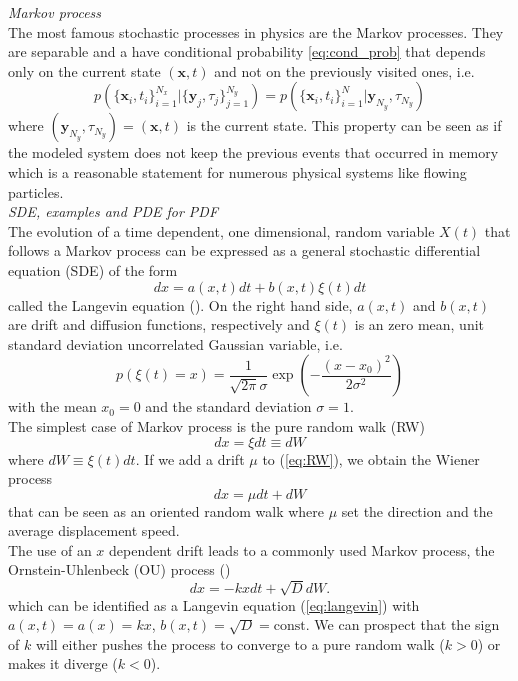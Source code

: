 \textit{Markov process}\\
The most famous stochastic processes in physics are the Markov processes. They are separable and a have conditional probability \eqref{eq:cond_prob} that depends only on the current state $(\textbf{x},t)$ and not on the previously visited ones, i.e. 
\[
p(\{\textbf{x}_i,t_i\}_{i=1}^{N_x}|\{\textbf{y}_j,\tau_j\}_{j=1}^{N_y})=p(\{\textbf{x}_i,t_i\}_{i=1}^N|\textbf{y}_{N_y},\tau_{N_y})
\]
where $(\textbf{y}_{N_y},\tau_{N_y})=(\textbf{x},t)$ is the current state.
This property can be seen as if the modeled system does not keep the previous events that occurred in memory which is a reasonable statement for numerous physical systems like flowing particles.\\
\textit{SDE, examples and PDE for PDF}\\
The evolution of a time dependent, one dimensional, random variable $X(t)$ that follows a Markov process can be expressed as a general stochastic differential equation (SDE) of the form
\begin{equation}
	dx = a(x,t)dt + b(x,t)\xi(t)dt
	\label{eq:langevin}
\end{equation}
called the Langevin equation (\citet[Eq. 4.1.1]{Gardiner1996}). 
On the right hand side, $a(x,t)$ and $b(x,t)$ are drift and diffusion functions, respectively and $\xi(t)$ is an zero mean, unit standard deviation uncorrelated Gaussian variable, i.e.
\[
p(\xi(t)=x)=\frac{1}{\sqrt{2\pi}\sigma}\exp(-\frac{(x-x_0)^2}{2\sigma^2})
\]
with the mean $x_0=0$ and the standard deviation $\sigma=1$.\\
The simplest case of Markov process is the pure random walk (RW)
\begin{equation}\label{eq:RW}
	dx = \xi dt \equiv dW
\end{equation}
where $dW\equiv\xi(t)dt$.
If we add a drift $\mu$ to (\ref{eq:RW}), we obtain the Wiener process
\begin{equation}\label{eq:wiener}
dx = \mu dt + dW
\end{equation}
that can be seen as an oriented random walk where $\mu$ set the direction and the average displacement speed.\\
The use of an $x$ dependent drift leads to a commonly used Markov process, the Ornstein-Uhlenbeck (OU) process (\citet[Sec. 3.8.4]{Gardiner1996})
\begin{equation}
dx = -kxdt + \sqrt{D}dW.
\label{eq:OU}
\end{equation}
which can be identified as a Langevin equation (\ref{eq:langevin}) with $a(x,t)=a(x)=kx$, $b(x,t)=\sqrt{D}=\mathrm{const}$. We can prospect that the sign of $k$ will either pushes the process to converge to a pure random walk ($k>0$) or makes it diverge ($k<0$).\\
